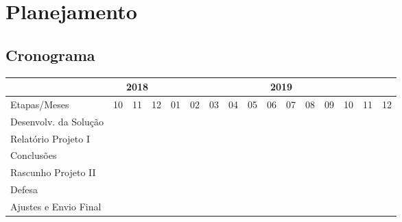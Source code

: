\documentclass[
	12pt,				%
	openright,			%
	twoside,			%
	a4paper,			%
	english,			%
	brazil,				%
	]{abntex2}
\begin{document}





\chapter{Planejamento}

\section{Cronograma}

\newcommand{\cc}{\cellcolor{black!25}}  %

\begin{flushleft}
\begin{tabular}{|l|c|c|c|c|c|c|c|c|c|c|c|c|c|c|c|}
\hline
       & \multicolumn{3}{c|}{2018} & \multicolumn{12}{c|}{2019}\\ \hline
       
Etapas/Meses            & 10  & 11  & 12  & 01  & 02  & 03  & 04  & 05  & 06  & 07  & 08  & 09  & 10  & 11  & 12  \\ \hline
Desenvolv. da Solução   & \cc & \cc & \cc & \cc & \cc & \cc & \cc & \cc & \cc & \cc &     &     &     &     &     \\ \hline
Relatório Projeto I     &     &     &     &     &     &     &     & \cc & \cc &     &     &     &     &     &     \\ \hline
Conclusões              &     &     &     &     &     &     &     &     &     & \cc & \cc &     &     &     &     \\ \hline
Rascunho Projeto II     &     &     &     &     &     &     &     &     &     &     &     & \cc & \cc &     &     \\ \hline
Defesa                  &     &     &     &     &     &     &     &     &     &     &     &     &     & \cc &     \\ \hline
Ajustes e Envio Final   &     &     &     &     &     &     &     &     &     &     &     &     &     & \cc & \cc \\ \hline
\end{tabular}
\end{flushleft}
\end{document}
